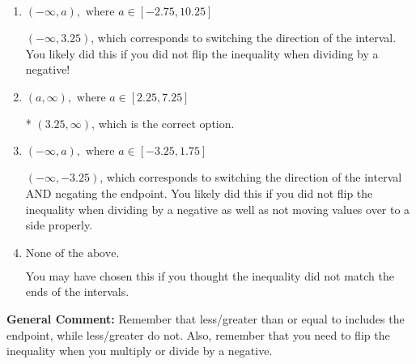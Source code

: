 \documentclass{extbook}[14pt]
\begin{document}
\begin{enumerate}
{\begin{enumerate}[label=\Alph*.]
 $(-3.25, \infty)$, which corresponds to negating the endpoint of the solution.
\item \( (-\infty, a), \text{ where } a \in [-2.75, 10.25] \)

 $(-\infty, 3.25)$, which corresponds to switching the direction of the interval. You likely did this if you did not flip the inequality when dividing by a negative!
\item \( (a, \infty), \text{ where } a \in [2.25, 7.25] \)

* $(3.25, \infty)$, which is the correct option.
\item \( (-\infty, a), \text{ where } a \in [-3.25, 1.75] \)

 $(-\infty, -3.25)$, which corresponds to switching the direction of the interval AND negating the endpoint. You likely did this if you did not flip the inequality when dividing by a negative as well as not moving values over to a side properly.
\item \( \text{None of the above}. \)

You may have chosen this if you thought the inequality did not match the ends of the intervals.
\end{enumerate}

\textbf{General Comment:} Remember that less/greater than or equal to includes the endpoint, while less/greater do not. Also, remember that you need to flip the inequality when you multiply or divide by a negative.
}
\end{enumerate}
\end{document}
